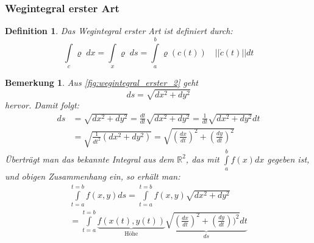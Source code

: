 \documentclass[12pt,a4paper]{report}%
\newtheorem{definition}[satz]{Definition}
\newtheorem{bem}{Bemerkung}[section]
\numberwithin{equation}{section}
\newcommand{\R}{\mathbb{R}} %
\numberwithin{equation}{subsection}
\begin{document}
	  \subsubsection{Wegintegral erster Art}
	  \begin{definition}
	    Das Wegintegral erster Art ist definiert durch:
	    \begin{equation}
	      \int\limits_c \varrho \; dx = \int\limits_x \varrho \; ds = \int\limits_a^b \varrho(c(t)) \quad || \dot{c}(t)|| dt \label{eq:wegintegral_1}
	    \end{equation}
	  \end{definition}
	  \begin{bem}
	    Aus \eqref{fig:wegintegral_erster_2} geht
	    \begin{equation*}
	      ds = \sqrt{dx^2 + dy^2}
	    \end{equation*}
	    hervor. Damit folgt:
	    \begin{align*}
	      ds &= \sqrt{dx^2 + dy^2} = \frac{dt}{dt}  \sqrt{dx^2 + dy^2} = \frac{1}{dt} \sqrt{dx^2 + dy^2}dt \\
	      &=  \sqrt{\frac{1}{dt^2}(dx^2 + dy^2)} =  \sqrt{\left(\frac{dx}{dt}\right)^2 + \left(\frac{dy}{dt}\right)^2}
	    \end{align*}
	    Überträgt man das bekannte Integral aus dem $\R^2$, das mit $\int\limits_a^b f(x) dx$ gegeben ist, und  obigen Zusammenhang ein, so erhält man:
	    \begin{align*}
	      \int\limits_{t=a}^{t=b} f(x,y) ds = \int\limits_{t=a}^{t=b} f(x,y) \sqrt{dx^2 + dy^2}\\
	      = \int\limits_{t=a}^{t=b} \underbrace{f(x(t),y(t))}_{\text{Höhe}} \underbrace{\sqrt{\left(\frac{dx}{dt}\right)^2 + \left(\frac{dy}{dt}\right))^2} dt}_{ds}
	    \end{align*}
	  \end{bem}
\end{document}
